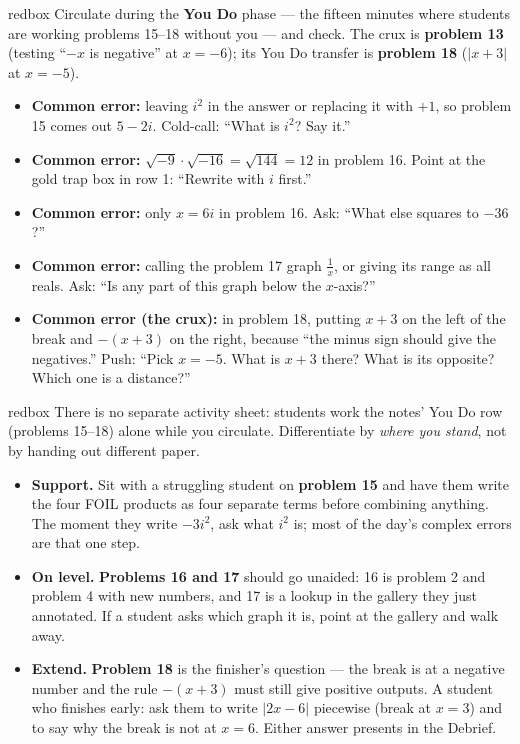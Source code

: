 \documentclass[10pt]{article}
\begin{document}
\begin{skillbox}{redbox}
Circulate during the \textbf{You Do} phase --- the fifteen minutes where students are working
problems 15--18 without you --- and check. The crux is \textbf{problem 13} (testing ``$-x$ is
negative'' at $x = -6$); its You Do transfer is \textbf{problem 18} ($|x + 3|$ at $x = -5$).
\begin{itemize}
  \item \textbf{Common error:} leaving $i^2$ in the answer or replacing it with $+1$, so
        problem 15 comes out $5 - 2i$. Cold-call: ``What is $i^2$? Say it.''
  \item \textbf{Common error:} $\sqrt{-9}\cdot\sqrt{-16} = \sqrt{144} = 12$ in problem 16.
        Point at the gold trap box in row 1: ``Rewrite with $i$ first.''
  \item \textbf{Common error:} only $x = 6i$ in problem 16. Ask: ``What else squares to $-36$?''
  \item \textbf{Common error:} calling the problem 17 graph $\frac{1}{x}$, or giving its range
        as all reals. Ask: ``Is any part of this graph below the $x$-axis?''
  \item \textbf{Common error (the crux):} in problem 18, putting $x + 3$ on the left of the
        break and $-(x + 3)$ on the right, because ``the minus sign should give the
        negatives.'' Push: ``Pick $x = -5$. What is $x + 3$ there? What is its opposite? Which
        one is a distance?''
\end{itemize}
\end{skillbox}

\begin{skillbox}{redbox}
There is no separate activity sheet: students work the notes' You Do row (problems 15--18)
alone while you circulate. Differentiate by \textit{where you stand}, not by handing out
different paper.

\begin{itemize}
  \item \textbf{Support.} Sit with a struggling student on \textbf{problem 15} and have them
        write the four FOIL products as four separate terms before combining anything. The
        moment they write $-3i^2$, ask what $i^2$ is; most of the day's complex errors are
        that one step.
  \item \textbf{On level.} \textbf{Problems 16 and 17} should go unaided: 16 is problem 2 and
        problem 4 with new numbers, and 17 is a lookup in the gallery they just annotated. If a
        student asks which graph it is, point at the gallery and walk away.
  \item \textbf{Extend.} \textbf{Problem 18} is the finisher's question --- the break is at a
        negative number and the rule $-(x + 3)$ must still give positive outputs. A student
        who finishes early: ask them to write $|2x - 6|$ piecewise (break at $x = 3$) and to
        say why the break is not at $x = 6$. Either answer presents in the Debrief.
\end{itemize}
\end{skillbox}
\end{document}
